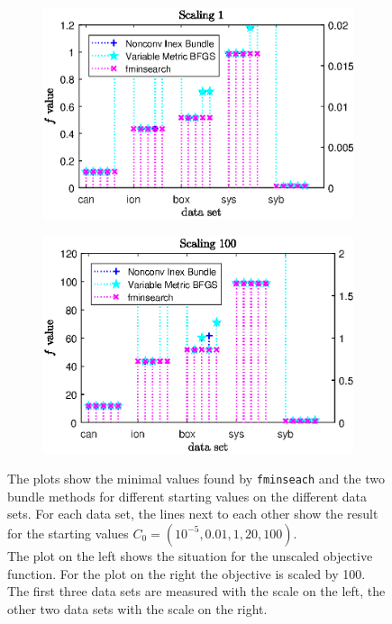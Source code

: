 \begin{figure}[ht]
	\begin{subfigure}{0.49\textwidth}
		\includegraphics[width=\textwidth]{Pictures/Plots/Scal1_ll-15f.eps}%
	\end{subfigure}%
	\hfill
	\begin{subfigure}{0.49\textwidth}
		\includegraphics[width=\textwidth]{Pictures/Plots/Scal100_ll-15f.eps}%
	\end{subfigure}
	\caption[Minimal values for different starting values and scalings]{The plots show the minimal values found by \textup{\texttt{fminseach}} and the two bundle methods for different starting values on the different data sets. For each data set, the lines next to each other show the result for the starting values \(C_0 = (10^{-5},0.01,1,20,100)\).\\
	The plot on the left shows the situation for the unscaled objective function. For the plot on the right the objective is scaled by 100.\\
	The first three data sets are measured with the scale on the left, the other two data sets with the scale on the right.}%
	\label{fig_ll15_sc1100_f}%
\end{figure}

